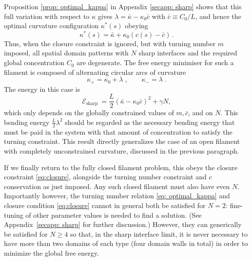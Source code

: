 \documentclass[
aip,
jcp,
reprint, 
floatfix
]{revtex4-1}
\begin{document}
Proposition \ref{prop: optimal_kappa} in Appendix \ref{secapp: sharp} shows that this full variation with respect to $\kappa$ gives $\lambda = \bar \kappa - \kappa_0\bar c $  with $\bar c \equiv C_0/L$, 
and hence the optimal curvature configuration $\kappa^*(s)$ obeying 
\begin{equation}\label{eq: optimal_kappa}
    \kappa^*(s)=\bar\kappa +\kappa_0(c(s)-\bar c)\,.
\end{equation}
Thus, when the closure constraint is ignored, but with turning number $m$  imposed, all spatial domain patterns with $N$ sharp interfaces and the required global concentration $C_0$ are degenerate. The free energy minimiser for such a filament is composed of alternating circular arcs of curvature 
\begin{equation} \label{eq: kappa_plus}
    \kappa_{+}= \kappa_0 + \lambda\;,  \qquad  \kappa_{-}=  \lambda\;.
\end{equation}
The energy in this case is 
\begin{equation} \label{eq: energy_sharp}
    \mathcal{E}_{\text {sharp }}=\frac{L}{2}\left(\bar{\kappa}-\kappa_0 \bar{c}\right)^2+\gamma N,
\end{equation}
which only depends on the globally constrained values of $m,\bar{c}$, and on $N$. This bending energy $\tfrac{L}{2} \lambda^2$ should be regarded as the necessary bending energy that must be paid in the system with that amount of concentration to satisfy the turning constraint. This result directly generalizes the case of  an open filament with completely unconstrained curvature, discussed in the previous paragraph.

If we finally return to the fully closed filament problem, this obeys the closure constraint \eqref{eq:closure}, alongside the turning number constraint and $c$ conservation as just imposed. Any such closed filament must also have even $N$.
Importantly however,  the turning number relation \eqref{eq: optimal_kappa} and closure condition \eqref{eq:closure} cannot in general both be satisfied for $N=2$: fine-tuning of other parameter values is needed to find a solution. (See Appendix~\ref{secapp: sharp} for further discussion.) However, they can generically be satisfied for $N\geq 4$ so that, in the sharp interface limit, it is never necessary to have more than two domains of each type (four domain walls in total) in order to minimize the global free energy. 
\end{document}
